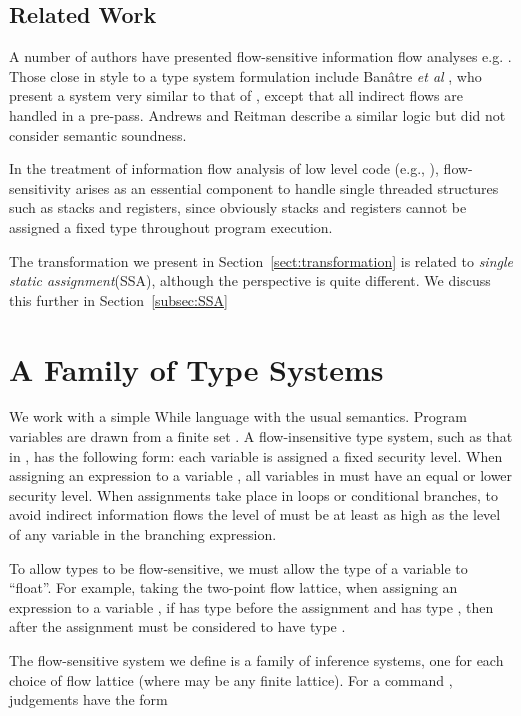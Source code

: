 \documentclass{sigplanconf}
\begin{document}
\subsection{Related Work}
A number of authors have presented flow-sensitive information flow
analyses e.g. \cite{Clark+:JCL}.
Those close in style to a type system formulation include Ban\^atre
\emph{et al} \cite{Banatre:Bryce:LeMetayer:ESORICS94}, who present a
system very similar to that of \cite{Amtoft:Banerjee:SAS04}, except
that all indirect flows are handled in a pre-pass. Andrews and Reitman 
describe a similar logic \cite{Andrews:Reitman:Axiomatic} but 
did not consider semantic soundness. 

In the treatment of information flow analysis of low level code (e.g.,
\cite{GenaimS05,Hedin:Sands:Timing}), flow-sensitivity arises as an essential
component to handle single threaded structures such as stacks and
registers, since obviously stacks and registers cannot be assigned a
fixed type throughout program execution.

The transformation we present in Section~\ref{sect:transformation} is 
related to \emph{single static assignment}(SSA)\cite{SSA}, although the perspective is quite different. We discuss this further in Section~\ref{subsec:SSA}


\section{A Family of Type Systems}
\label{sect:family}

We work with a simple While language with the usual semantics.
Program variables are drawn from a finite set .
A flow-insensitive type system, such as that in \cite{Volpano:Smith:Irvine:Sound},
has the following form: each variable is assigned a fixed security
level. When assigning an expression to a variable , all
variables in  must have an equal or lower security level.  When
assignments take place in loops or conditional branches, to avoid
indirect information flows the level of  must be at least as high
as the level of any variable in the branching expression.

To allow types to be flow-sensitive, we must allow the type of a variable to ``float''. 
For example, taking the two-point flow lattice, 
when assigning an expression to a variable , 
if  has type  before the assignment and  has type , then 
after the assignment  must be considered to have type . 

The flow-sensitive system we define is 
a family of inference systems, 
one for each choice of flow lattice  (where  may be
any finite lattice).
For a command , judgements have the form
\end{document}
